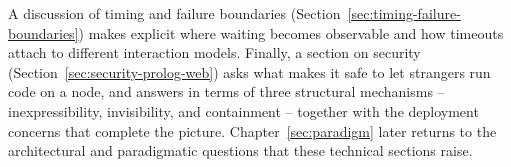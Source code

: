 A discussion of timing and failure boundaries
(Section~\ref{sec:timing-failure-boundaries}) makes explicit where
waiting becomes observable and how timeouts attach to different
interaction models. Finally, a section on security
(Section~\ref{sec:security-prolog-web}) asks what makes it safe to
let strangers run code on a node, and answers in terms of three
structural mechanisms -- inexpressibility, invisibility, and
containment -- together with the deployment concerns that complete
the picture. Chapter~\ref{sec:paradigm} later returns to the
architectural and paradigmatic questions that these technical
sections raise.

%
%
%
%
